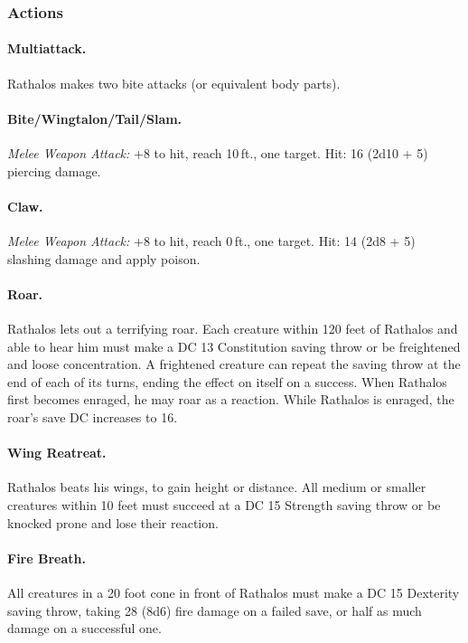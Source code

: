 \begin{hbMonsterNoteWide}[b]
\begin{multicols}{2}
\begin{hbStatBlock}
\subsubsection*{Actions}

\paragraph*{Multiattack.} Rathalos makes two bite attacks (or equivalent body parts).

\paragraph*{Bite/Wingtalon/Tail/Slam.} \textit{Melee Weapon Attack:} +8 to hit, reach 10\,ft., one target. Hit: 16 (2d10 + 5) piercing damage.

\paragraph*{Claw.} \textit{Melee Weapon Attack:} +8 to hit, reach 0\,ft., one target. Hit: 14 (2d8 + 5) slashing damage and apply poison.

\paragraph*{Roar.} Rathalos lets out a terrifying roar. Each creature within 120 feet of Rathalos and able to hear him must make a DC 13 Constitution saving throw or be freightened and loose concentration. A frightened creature can repeat the saving throw at the end of each of its turns, ending the effect on itself on a success. When Rathalos first becomes enraged, he may roar as a reaction. While Rathalos is enraged, the roar's save DC increases to 16.

\paragraph*{Wing Reatreat.} Rathalos beats his wings, to gain height or distance. All medium or smaller creatures within 10 feet must succeed at a DC 15 Strength saving throw or be knocked prone and lose their reaction.

\paragraph*{Fire Breath.} All creatures in a 20 foot cone in front of Rathalos must make a DC 15 Dexterity saving throw, taking 28 (8d6) fire damage on a failed save, or half as much damage on a successful one.


\end{hbStatBlock}
\end{multicols}
\end{hbMonsterNoteWide}
